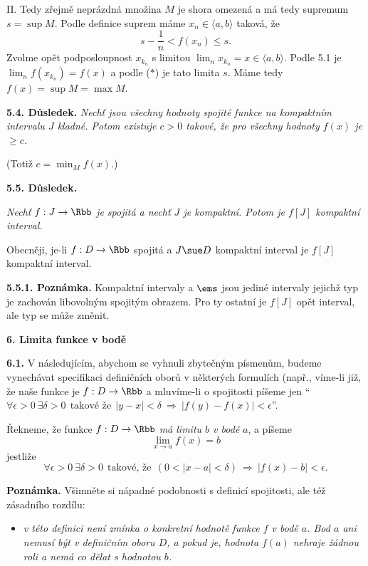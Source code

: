 \documentclass[12pt]{article}
\begin{document}
{ \smallskip
 
 II. Tedy zřejmě neprázdná množina $M$ je shora omezená a má tedy supremum 
 $s=\sup M$. Podle definice suprem máme
 $x_n\in\langle a,b\rangle$ taková, že
 \begin{equation}
 s-\frac1n < f(x_n)\leq s. \tag{$*$}
 \end{equation}
Zvolme opět podposloupnost $x_{k_n}$ s limitou $\lim_nx_{k_n}=x\in\langle a,b\rangle$. Podle 5.1 je $\lim_nf(x_{k_n})=f(x)$ a podle ($*$) je tato limita $s$. Máme tedy $f(x)=\sup M=\max M$.\sq

\bigskip


{\bf 5.4. Důsledek.} {\em Nechť jsou všechny hodnoty spojité funkce na kompaktním intervalu $J$ kladné. 
Potom existuje $c> 0$ takové, že pro všechny hodnoty $f(x)$ je $\geq c$.}

(Totiž $c=\min_Mf(x)$.)

\bigskip

{\bf 5.5. Důsledek.} {\em Nechť $f:J\to\Rbb$ je spojitá a nechť $J$ je kompaktní. Potom je $f[J]$ kompaktní interval.

Obecněji, je-li $f:D\to\Rbb$ spojitá  a $J\sue D$  kompaktní interval je $f[J]$ kompaktní interval.}

\medskip

{\bf 5.5.1. Poznámka.} Kompaktní intervaly a  $\ems$ jsou jediné intervaly jejichž typ je zachován libovolným spojitým obrazem. Pro ty ostatní je $f[J]$ opět interval, ale typ se může změnit.


 \vskip10mm
 
 {\large\bf 6. Limita funkce v bodě}
 
 \bigskip
 
 {\bf 6.1.} V následujícím, abychom se vyhnuli zbytečným písmenům, budeme vynechávat specifikaci definičních oborů v některých formulích
(např., víme-li již, že naše funkce je $f:D\to\Rbb$ a mluvíme-li o spojitosti píšeme jen  ``$\forall \epsilon>0\ \exists \delta>0\ \ \text{takové že}\ \  |y-x|<\delta\ \Rightarrow\ |f(y)-f(x)|<\epsilon$''.

\medskip


Řekneme, že funkce $f:D\to\Rbb$ {\em má limitu $b$ v bodě} $a$, a píšeme
$$
\lim_{x\to a}f(x)= b
$$
jestliže
 $$
 \forall \epsilon>0\ \exists \delta>0\ \ \text{takové, že}\ \ (0< |x-a|<\delta)\ \Rightarrow\ |f(x)-b|<\epsilon.
$$

\medskip

{\bf Poznámka.} Všimněte si nápadné podobnosti s definicí spojitosti, ale též zásadního rozdílu:
\begin{itemize}
\item[] {\em v této definici není zmínka o konkretní hodnotě funkce $f$ v bodě $a$. Bod $a$ ani nemusí být v definičním oboru
 $D$, a  pokud je, hodnota $f(a)$ nehraje žádnou roli a nemá co dělat s hodnotou  $b$.}
\end{itemize}

}
\end{document}
